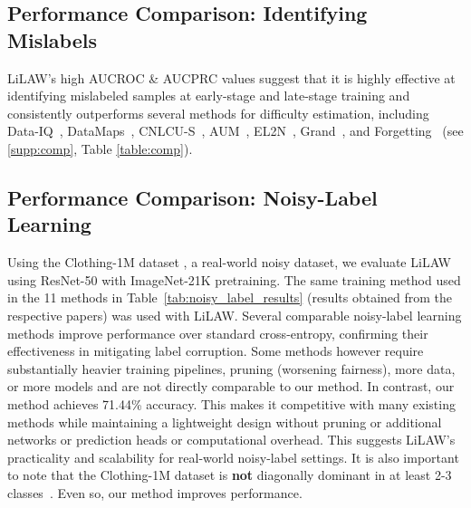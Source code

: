 \documentclass{article}
\theoremstyle{plain}
\theoremstyle{definition}
\theoremstyle{remark}
\begin{document}

\subsection{Performance Comparison: Identifying Mislabels}

LiLAW's high AUCROC \& AUCPRC values suggest that it is highly effective at identifying mislabeled samples at early-stage and late-stage training and consistently outperforms several methods for difficulty estimation, including Data-IQ~\citep{seedat_data-iq_2022}, DataMaps~\citep{swayamdipta_dataset_2020}, CNLCU-S~\citep{xia_sample_2021}, AUM~\citep{pleiss_identifying_2020}, EL2N~\citep{paul_deep_2023}, Grand~\citep{paul_deep_2023}, and Forgetting~\citep{toneva_empirical_2019} (see \ref{supp:comp}, Table \ref{table:comp}).

\subsection{Performance Comparison: Noisy-Label Learning}

Using the Clothing-1M dataset \citep{xiao2015learning}, a real-world noisy dataset, we evaluate LiLAW using ResNet-50 with ImageNet-21K pretraining. The same training method used in the 11 methods in Table~\ref{tab:noisy_label_results} (results obtained from the respective papers) was used with LiLAW. Several comparable noisy-label learning methods improve performance over standard cross-entropy, confirming their effectiveness in mitigating label corruption. Some methods however require substantially heavier training pipelines, pruning (worsening fairness), more data, or more models and are not directly comparable to our method. In contrast, our method achieves 71.44\% accuracy. This makes it competitive with many existing methods while maintaining a lightweight design without pruning or additional networks or prediction heads or computational overhead. This suggests LiLAW's practicality and scalability for real-world noisy-label settings. It is also important to note that the Clothing-1M dataset is \textbf{not} diagonally dominant in at least 2-3 classes~\cite{hedderich2021analysing}. Even so, our method improves performance.
\end{document}

